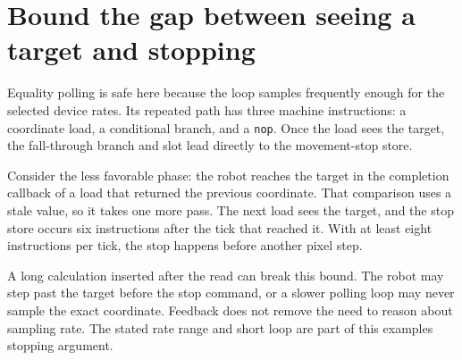 \section{Bound the gap between seeing a target and
  stopping}\label{006-marsbot-square-p06-bound-the-gap-between-seeing-a-target-and-stopping}

Equality polling is safe here because the loop samples frequently enough
for the selected device rates. Its repeated path has three machine
instructions: a coordinate load, a conditional branch, and a
\texttt{nop}. Once the load sees the target, the fall-through branch and
slot lead directly to the movement-stop store.

Consider the less favorable phase: the robot reaches the target in the
completion callback of a load that returned the previous coordinate.
That comparison uses a stale value, so it takes one more pass. The next
load sees the target, and the stop store occurs six instructions after
the tick that reached it. With at least eight instructions per tick, the
stop happens before another pixel step.

A long calculation inserted after the read can break this bound. The
robot may step past the target before the stop command, or a slower
polling loop may never sample the exact coordinate. Feedback does not
remove the need to reason about sampling rate. The stated rate range and
short loop are part of this example\textquotesingle s stopping argument.
